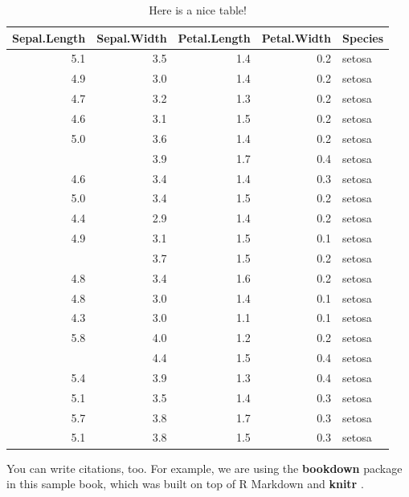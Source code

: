 \documentclass[
]{book}
\begin{document}
\begin{table}

\caption{\label{tab:nice-tab}Here is a nice table!}
\centering
\begin{tabular}[t]{rrrrl}
\toprule
Sepal.Length & Sepal.Width & Petal.Length & Petal.Width & Species\\
\midrule
5.1 & 3.5 & 1.4 & 0.2 & setosa\\
4.9 & 3.0 & 1.4 & 0.2 & setosa\\
4.7 & 3.2 & 1.3 & 0.2 & setosa\\
4.6 & 3.1 & 1.5 & 0.2 & setosa\\
5.0 & 3.6 & 1.4 & 0.2 & setosa\\
\addlinespace
5.4 & 3.9 & 1.7 & 0.4 & setosa\\
4.6 & 3.4 & 1.4 & 0.3 & setosa\\
5.0 & 3.4 & 1.5 & 0.2 & setosa\\
4.4 & 2.9 & 1.4 & 0.2 & setosa\\
4.9 & 3.1 & 1.5 & 0.1 & setosa\\
\addlinespace
5.4 & 3.7 & 1.5 & 0.2 & setosa\\
4.8 & 3.4 & 1.6 & 0.2 & setosa\\
4.8 & 3.0 & 1.4 & 0.1 & setosa\\
4.3 & 3.0 & 1.1 & 0.1 & setosa\\
5.8 & 4.0 & 1.2 & 0.2 & setosa\\
\addlinespace
5.7 & 4.4 & 1.5 & 0.4 & setosa\\
5.4 & 3.9 & 1.3 & 0.4 & setosa\\
5.1 & 3.5 & 1.4 & 0.3 & setosa\\
5.7 & 3.8 & 1.7 & 0.3 & setosa\\
5.1 & 3.8 & 1.5 & 0.3 & setosa\\
\bottomrule
\end{tabular}
\end{table}

You can write citations, too. For example, we are using the \textbf{bookdown} package \citep{R-bookdown} in this sample book, which was built on top of R Markdown and \textbf{knitr} \citep{xie2015}.

  
\end{document}
